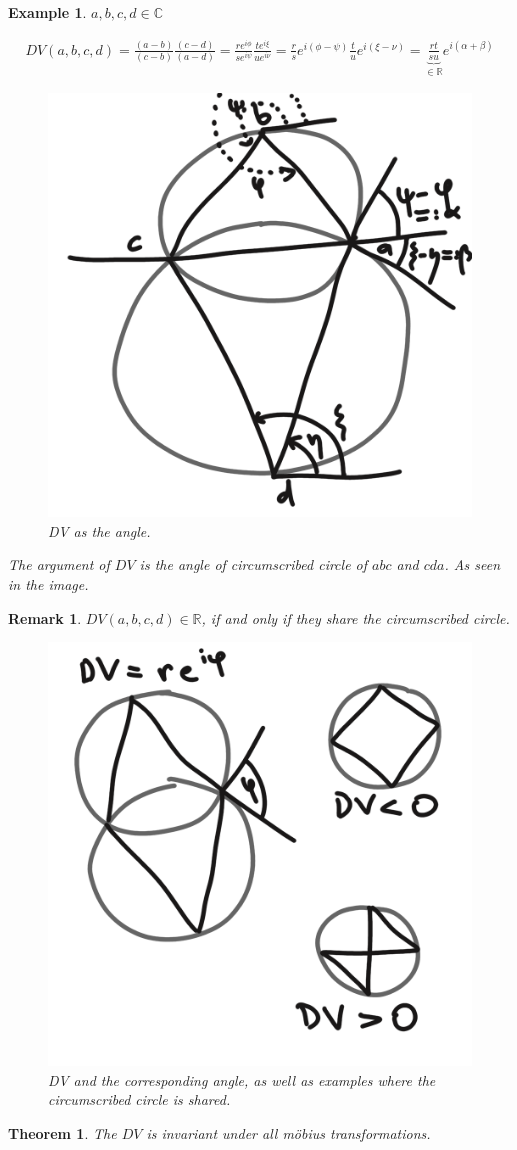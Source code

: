 \documentclass[]{article}
\newtheorem{theorem}{Theorem}
\newtheorem{example}{Example}
\newtheorem{remark}{Remark}
\begin{document}
\begin{example}
	$a,b,c,d \in \mathbb{C}$
	
	\begin{align*}
		DV(a,b,c,d) = \frac{(a-b)}{(c-b)} \frac{(c-d)}{(a-d)} = \frac{r e^{i\phi}}{s e^{i\psi}} \frac{t e^{i\xi}}{u e^{i\nu}} = \frac{r}{s} e^{i(\phi - \psi)} \frac{t}{u} e^{i(\xi - \nu)} = \underbrace{\frac{rt}{su}}_{\in \mathbb{R}} e^{i(\alpha + \beta)}
	\end{align*}
	
	
	\begin{figure}[h!]
		\centering
		\includegraphics[width=0.3\linewidth]{figures/DV_angle}
		\caption{DV as the angle.}
		\label{fig:DV_angle}
	\end{figure}
	
	The argument of $DV$ is the angle of circumscribed circle of $abc$ and $cda$. As seen in the image.
\end{example}

\begin{remark}
	$DV(a,b,c,d) \in \mathbb{R}$, if and only if they share the circumscribed circle.
	
	\begin{figure}[h!]
		\centering
		\includegraphics[width=0.3\linewidth]{figures/DV_same_circle}
		\caption{DV and the corresponding angle, as well as examples where the circumscribed circle is shared.}
		\label{fig:DV_same_circle}
	\end{figure}
\end{remark}

\begin{theorem}
	The $DV$ is invariant under all möbius transformations.
\end{theorem}
\end{document}
